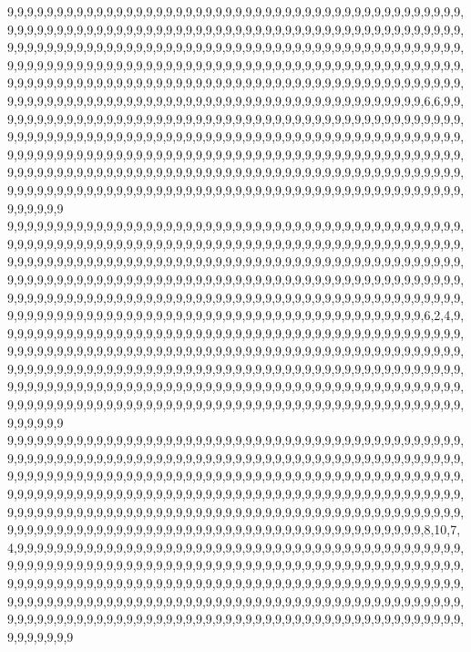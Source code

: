 9,9,9,9,9,9,9,9,9,9,9,9,9,9,9,9,9,9,9,9,9,9,9,9,9,9,9,9,9,9,9,9,9,9,9,9,9,9,9,9,9,9,9,9,9,9,9,9,9,9,9,9,9,9,9,9,9,9,9,9,9,9,9,9,9,9,9,9,9,9,9,9,9,9,9,9,9,9,9,9,9,9,9,9,9,9,9,9,9,9,9,9,9,9,9,9,9,9,9,9,9,9,9,9,9,9,9,9,9,9,9,9,9,9,9,9,9,9,9,9,9,9,9,9,9,9,9,9,9,9,9,9,9,9,9,9,9,9,9,9,9,9,9,9,9,9,9,9,9,9,9,9,9,9,9,9,9,9,9,9,9,9,9,9,9,9,9,9,9,9,9,9,9,9,9,9,9,9,9,9,9,9,9,9,9,9,9,9,9,9,9,9,9,9,9,9,9,9,9,9,9,9,9,9,9,9,9,9,9,9,9,9,9,9,9,9,9,9,9,9,9,9,9,9,9,9,9,9,9,9,9,9,9,9,9,9,9,9,9,9,9,9,9,9,9,9,9,9,9,9,9,9,9,9,9,9,9,9,9,9,9,9,9,9,9,9,9,9,9,9,9,9,6,6,9,9,9,9,9,9,9,9,9,9,9,9,9,9,9,9,9,9,9,9,9,9,9,9,9,9,9,9,9,9,9,9,9,9,9,9,9,9,9,9,9,9,9,9,9,9,9,9,9,9,9,9,9,9,9,9,9,9,9,9,9,9,9,9,9,9,9,9,9,9,9,9,9,9,9,9,9,9,9,9,9,9,9,9,9,9,9,9,9,9,9,9,9,9,9,9,9,9,9,9,9,9,9,9,9,9,9,9,9,9,9,9,9,9,9,9,9,9,9,9,9,9,9,9,9,9,9,9,9,9,9,9,9,9,9,9,9,9,9,9,9,9,9,9,9,9,9,9,9,9,9,9,9,9,9,9,9,9,9,9,9,9,9,9,9,9,9,9,9,9,9,9,9,9,9,9,9,9,9,9,9,9,9,9,9,9,9,9,9,9,9,9,9,9,9,9,9,9,9,9,9,9,9,9,9,9,9,9,9,9,9,9,9,9,9,9,9,9,9,9,9,9,9,9,9,9,9,9,9,9,9,9,9,9,9,9,9,9
9,9,9,9,9,9,9,9,9,9,9,9,9,9,9,9,9,9,9,9,9,9,9,9,9,9,9,9,9,9,9,9,9,9,9,9,9,9,9,9,9,9,9,9,9,9,9,9,9,9,9,9,9,9,9,9,9,9,9,9,9,9,9,9,9,9,9,9,9,9,9,9,9,9,9,9,9,9,9,9,9,9,9,9,9,9,9,9,9,9,9,9,9,9,9,9,9,9,9,9,9,9,9,9,9,9,9,9,9,9,9,9,9,9,9,9,9,9,9,9,9,9,9,9,9,9,9,9,9,9,9,9,9,9,9,9,9,9,9,9,9,9,9,9,9,9,9,9,9,9,9,9,9,9,9,9,9,9,9,9,9,9,9,9,9,9,9,9,9,9,9,9,9,9,9,9,9,9,9,9,9,9,9,9,9,9,9,9,9,9,9,9,9,9,9,9,9,9,9,9,9,9,9,9,9,9,9,9,9,9,9,9,9,9,9,9,9,9,9,9,9,9,9,9,9,9,9,9,9,9,9,9,9,9,9,9,9,9,9,9,9,9,9,9,9,9,9,9,9,9,9,9,9,9,9,9,9,9,9,9,9,9,9,9,9,9,9,9,9,9,9,9,6,2,4,9,9,9,9,9,9,9,9,9,9,9,9,9,9,9,9,9,9,9,9,9,9,9,9,9,9,9,9,9,9,9,9,9,9,9,9,9,9,9,9,9,9,9,9,9,9,9,9,9,9,9,9,9,9,9,9,9,9,9,9,9,9,9,9,9,9,9,9,9,9,9,9,9,9,9,9,9,9,9,9,9,9,9,9,9,9,9,9,9,9,9,9,9,9,9,9,9,9,9,9,9,9,9,9,9,9,9,9,9,9,9,9,9,9,9,9,9,9,9,9,9,9,9,9,9,9,9,9,9,9,9,9,9,9,9,9,9,9,9,9,9,9,9,9,9,9,9,9,9,9,9,9,9,9,9,9,9,9,9,9,9,9,9,9,9,9,9,9,9,9,9,9,9,9,9,9,9,9,9,9,9,9,9,9,9,9,9,9,9,9,9,9,9,9,9,9,9,9,9,9,9,9,9,9,9,9,9,9,9,9,9,9,9,9,9,9,9,9,9,9,9,9,9,9,9,9,9,9,9,9,9,9,9,9,9,9,9
9,9,9,9,9,9,9,9,9,9,9,9,9,9,9,9,9,9,9,9,9,9,9,9,9,9,9,9,9,9,9,9,9,9,9,9,9,9,9,9,9,9,9,9,9,9,9,9,9,9,9,9,9,9,9,9,9,9,9,9,9,9,9,9,9,9,9,9,9,9,9,9,9,9,9,9,9,9,9,9,9,9,9,9,9,9,9,9,9,9,9,9,9,9,9,9,9,9,9,9,9,9,9,9,9,9,9,9,9,9,9,9,9,9,9,9,9,9,9,9,9,9,9,9,9,9,9,9,9,9,9,9,9,9,9,9,9,9,9,9,9,9,9,9,9,9,9,9,9,9,9,9,9,9,9,9,9,9,9,9,9,9,9,9,9,9,9,9,9,9,9,9,9,9,9,9,9,9,9,9,9,9,9,9,9,9,9,9,9,9,9,9,9,9,9,9,9,9,9,9,9,9,9,9,9,9,9,9,9,9,9,9,9,9,9,9,9,9,9,9,9,9,9,9,9,9,9,9,9,9,9,9,9,9,9,9,9,9,9,9,9,9,9,9,9,9,9,9,9,9,9,9,9,9,9,9,9,9,9,9,9,9,9,9,9,9,9,9,9,9,9,9,8,10,7,4,9,9,9,9,9,9,9,9,9,9,9,9,9,9,9,9,9,9,9,9,9,9,9,9,9,9,9,9,9,9,9,9,9,9,9,9,9,9,9,9,9,9,9,9,9,9,9,9,9,9,9,9,9,9,9,9,9,9,9,9,9,9,9,9,9,9,9,9,9,9,9,9,9,9,9,9,9,9,9,9,9,9,9,9,9,9,9,9,9,9,9,9,9,9,9,9,9,9,9,9,9,9,9,9,9,9,9,9,9,9,9,9,9,9,9,9,9,9,9,9,9,9,9,9,9,9,9,9,9,9,9,9,9,9,9,9,9,9,9,9,9,9,9,9,9,9,9,9,9,9,9,9,9,9,9,9,9,9,9,9,9,9,9,9,9,9,9,9,9,9,9,9,9,9,9,9,9,9,9,9,9,9,9,9,9,9,9,9,9,9,9,9,9,9,9,9,9,9,9,9,9,9,9,9,9,9,9,9,9,9,9,9,9,9,9,9,9,9,9,9,9,9,9,9,9,9,9,9,9,9,9,9,9,9,9,9
